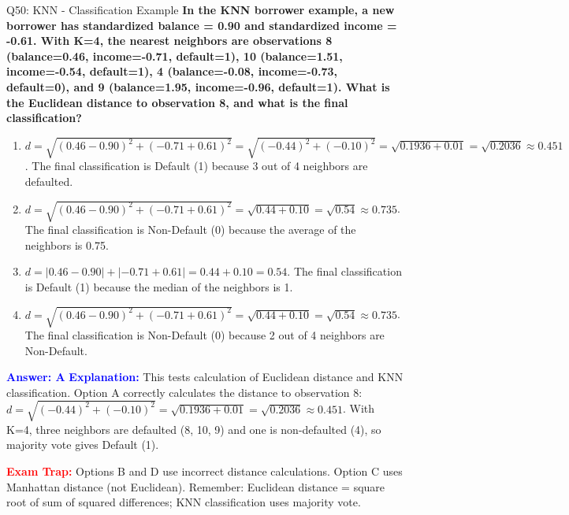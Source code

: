 \documentclass[8pt]{beamer}
\begin{document}
	\begin{frame}{Q50: KNN - Classification Example}
		\fontsize{6.5}{7.5}\selectfont
		\textbf{In the KNN borrower example, a new borrower has standardized balance = 0.90 and standardized income = -0.61. With K=4, the nearest neighbors are observations 8 (balance=0.46, income=-0.71, default=1), 10 (balance=1.51, income=-0.54, default=1), 4 (balance=-0.08, income=-0.73, default=0), and 9 (balance=1.95, income=-0.96, default=1). What is the Euclidean distance to observation 8, and what is the final classification?}
		
		\begin{enumerate}
			\item $d = \sqrt{(0.46-0.90)^2 + (-0.71+0.61)^2} = \sqrt{(-0.44)^2 + (-0.10)^2} = \sqrt{0.1936 + 0.01} = \sqrt{0.2036} \approx 0.451$. The final classification is Default (1) because 3 out of 4 neighbors are defaulted.
			\item $d = \sqrt{(0.46-0.90)^2 + (-0.71+0.61)^2} = \sqrt{0.44 + 0.10} = \sqrt{0.54} \approx 0.735$. The final classification is Non-Default (0) because the average of the neighbors is 0.75.
			\item $d = |0.46-0.90| + |-0.71+0.61| = 0.44 + 0.10 = 0.54$. The final classification is Default (1) because the median of the neighbors is 1.
			\item $d = \sqrt{(0.46-0.90)^2 + (-0.71+0.61)^2} = \sqrt{0.44 + 0.10} = \sqrt{0.54} \approx 0.735$. The final classification is Non-Default (0) because 2 out of 4 neighbors are Non-Default.
		\end{enumerate}
		
		\vspace{0.1cm}
		\textcolor{blue}{\textbf{Answer: A}}
		\vspace{0.1cm}
		\textcolor{blue}{\textbf{Explanation:}} This tests calculation of Euclidean distance and KNN classification. Option A correctly calculates the distance to observation 8: $d = \sqrt{(-0.44)^2 + (-0.10)^2} = \sqrt{0.1936 + 0.01} = \sqrt{0.2036} \approx 0.451$. With K=4, three neighbors are defaulted (8, 10, 9) and one is non-defaulted (4), so majority vote gives Default (1).
		
		\textcolor{red}{\textbf{Exam Trap:}} Options B and D use incorrect distance calculations. Option C uses Manhattan distance (not Euclidean). Remember: Euclidean distance = square root of sum of squared differences; KNN classification uses majority vote.
	\end{frame}
	
\end{document}
